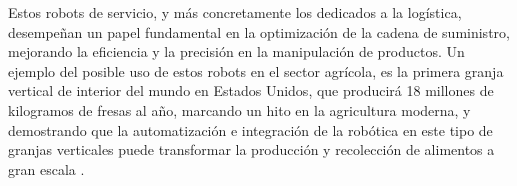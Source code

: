 
Estos robots de servicio, y más concretamente los dedicados a la logística, desempeñan un papel fundamental en la optimización de la cadena de suministro, mejorando la eficiencia y la precisión en la manipulación de productos. Un ejemplo del posible uso de estos robots en el sector agrícola, es la primera granja vertical de interior del mundo en Estados Unidos, que producirá 18 millones de kilogramos de fresas al año, marcando un hito en la agricultura moderna, y demostrando que la automatización e integración de la robótica en este tipo de granjas verticales puede transformar la producción y recolección de alimentos a gran escala \cite{EcoInventos24}.
 
 
 
  
